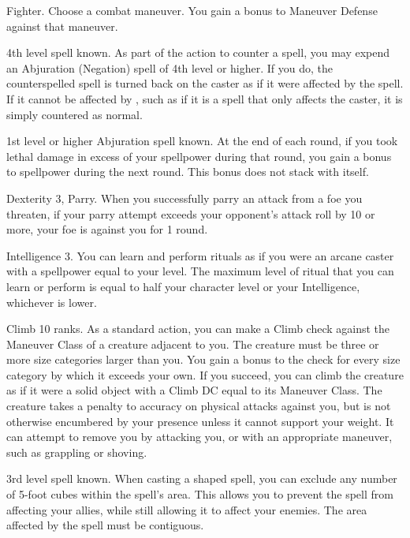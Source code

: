 \featpre Fighter.
\featben Choose a combat maneuver.
You gain a  bonus to Maneuver Defense against that maneuver.

\featpre 4th level spell known.
\featben As part of the action to counter a spell, you may expend an Abjuration (Negation) spell of 4th level or higher.
If you do, the counterspelled spell is turned back on the caster as if it were affected by the 
spell.
If it cannot be affected by , such as if it is a spell that only affects the caster, it is simply countered as normal.

\featpre 1st level or higher Abjuration spell known.
\featben At the end of each round, if you took lethal damage in excess of your spellpower during that round, you gain a  bonus to spellpower during the next round.
This bonus does not stack with itself.

\featpres Dexterity 3, Parry.
\featben When you successfully parry an attack from a foe you threaten, if your parry attempt exceeds your opponent's attack roll by 10 or more, your foe is  against you for 1 round.

\featpre Intelligence 3.
\featben You can learn and perform rituals as if you were an arcane caster with a spellpower equal to your level.
The maximum level of ritual that you can learn or perform is equal to half your character level or your Intelligence, whichever is lower.

\featpre Climb 10 ranks.
\featben As a standard action, you can make a Climb check against the Maneuver Class of a creature adjacent to you.
The creature must be three or more size categories larger than you.
You gain a  bonus to the check for every size category by which it exceeds your own.
If you succeed, you can climb the creature as if it were a solid object with a Climb DC equal to its Maneuver Class.
The creature takes a  penalty to accuracy on physical attacks against you, but is not otherwise encumbered by your presence unless it cannot support your weight.
It can attempt to remove you by attacking you, or with an appropriate maneuver, such as grappling or shoving.

\featpre 3rd level spell known.
\featben When casting a shaped spell, you can exclude any number of 5-foot cubes within the spell's area.
This allows you to prevent the spell from affecting your allies, while still allowing it to affect your enemies.
The area affected by the spell must be contiguous.

